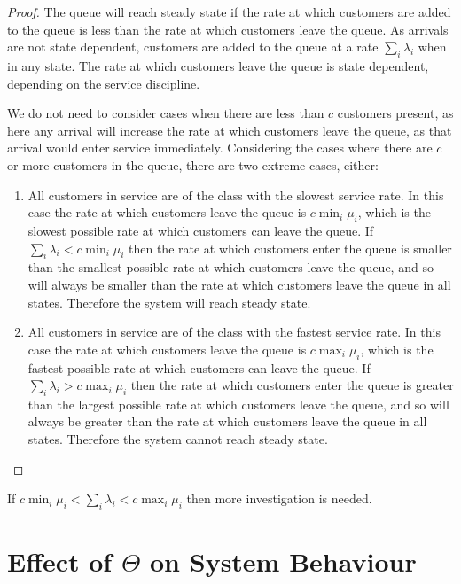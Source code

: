 \documentclass{article}
\begin{document}
\begin{proof}
The queue will reach steady state if the rate at which customers are added to
the queue is less than the rate at which customers leave the queue.
As arrivals are not state dependent, customers are added to the queue at a rate
$\sum_i \lambda_i$ when in any state.
The rate at which customers leave the queue is state dependent, depending on the
service discipline.

We do not need to consider cases when there are less than $c$ customers present,
as here any arrival will increase the rate at which customers leave the queue,
as that arrival would enter service immediately.
Considering the cases where there are $c$ or more customers in the queue, there
are two extreme cases, either:

\begin{enumerate}
  \item All customers in service are of the class with the slowest service rate.
  In this case the rate at which customers leave the queue is $c \min_i \mu_i$,
  which is the slowest possible rate at which customers can leave the queue.
  If $\sum_i \lambda_i < c \min_i \mu_i$ then the rate at which customers enter
  the queue is smaller than the smallest possible rate at which customers leave
  the queue, and so will always be smaller than the rate at which customers
  leave the queue in all states. Therefore the system will reach steady state.
  \item All customers in service are of the class with the fastest service rate.
  In this case the rate at which customers leave the queue is $c \max_i \mu_i$,
  which is the fastest possible rate at which customers can leave the queue.
  If $\sum_i \lambda_i > c \max_i \mu_i$ then the rate at which customers enter
  the queue is greater than the largest possible rate at which customers leave
  the queue, and so will always be greater than the rate at which customers
  leave the queue in all states. Therefore the system cannot reach steady state.
\end{enumerate}
\end{proof}

If $c \min_i \mu_i < \sum_i \lambda_i < c \max_i \mu_i$ then more investigation
is needed.

\section{Effect of $\Theta$ on System Behaviour}



\end{document}
